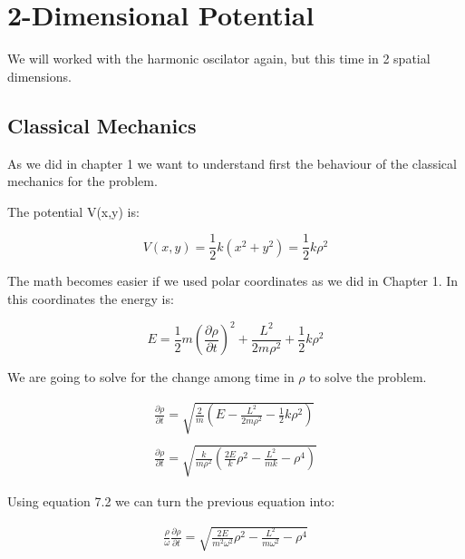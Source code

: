 \setchapterpreamble[u]{\margintoc}
\chapter{2-Dimensional Potential}

We will worked with the harmonic oscilator again, but this time in 2 spatial dimensions.

\section{Classical Mechanics}

As we did in chapter 1 we want to understand first the behaviour of the classical mechanics for the problem.

The potential V(x,y) is:

\begin{equation}
  V(x,y) = \frac{1}{2} k (x^2+y^2) = \frac{1}{2} k \rho^2
\end{equation}

The math becomes easier if we used polar coordinates as we did in Chapter 1. In this coordinates the energy is:

\begin{equation}
  E = \frac{1}{2} m \left(\frac{\partial \rho}{\partial t}\right)^2 + \frac{L^2}{2m\rho^2} + \frac{1}{2}k \rho^2
\end{equation}

We are going to solve for the change among time in $\rho$ to solve the problem.

\begin{equation}
  \begin{array}{c}
    \frac{\partial \rho}{\partial t} = \sqrt{\frac{2}{m}\left(E-\frac{L^2}{2 m \rho^2}-\frac{1}{2}k\rho^2\right)}
    \\

    \\
    \frac{\partial \rho}{\partial t} = \sqrt{\frac{k}{m\rho^2}\left(\frac{2E}{k}\rho^2-\frac{L^2}{m k}-\rho^4\right)}
  \end{array}
\end{equation}

Using equation 7.2 we can turn the previous equation into:

\begin{equation}
  \begin{array}{c}
    \frac{\rho}{\omega}\frac{\partial \rho}{\partial t} = \sqrt{\frac{2E}{m^2\omega^2}\rho^2 - \frac{L^2}{m \omega^2}-\rho^4}
  \end{array}
\end{equation}


